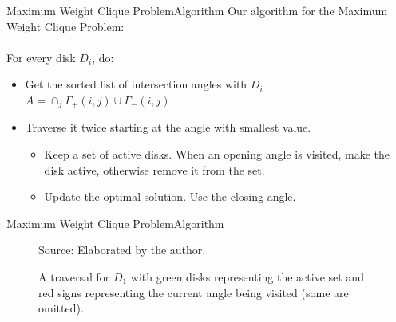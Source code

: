 \documentclass{beamer}
\newcommand{\source}[1]{\caption*{Source: {#1}} }
\begin{document}
\begin{frame}{Maximum Weight Clique Problem}{Algorithm}
	Our algorithm for the Maximum Weight Clique Problem:\\~\\
	
	For every disk $D_i$, do:
	\begin{itemize}
		\item Get the sorted list of intersection angles with $D_i$
				$A=\cap_{j}\Gamma_+(i,j) \cup \Gamma_-(i,j)$.
		\item Traverse it twice starting at the angle with smallest value.
		\begin{itemize}
			\item Keep a set of active disks. When an opening angle is visited, make the disk active, otherwise remove it from the set.
			\item Update the optimal solution. Use the closing angle.
		\end{itemize}
	\end{itemize}
\end{frame}


	
%	

\begin{frame}{Maximum Weight Clique Problem}{Algorithm}

	\begin{figure}
		\caption{A traversal for $D_1$ with green disks representing the active set and red signs representing the current angle being visited (some are omitted).}
			\source{Elaborated by the author.}
	\end{figure}
\end{frame}
\end{document}

